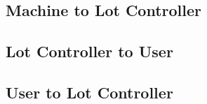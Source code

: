 \subsection{Machine to Lot Controller}

\subsection{Lot Controller to User}

\subsection{User to Lot Controller}
